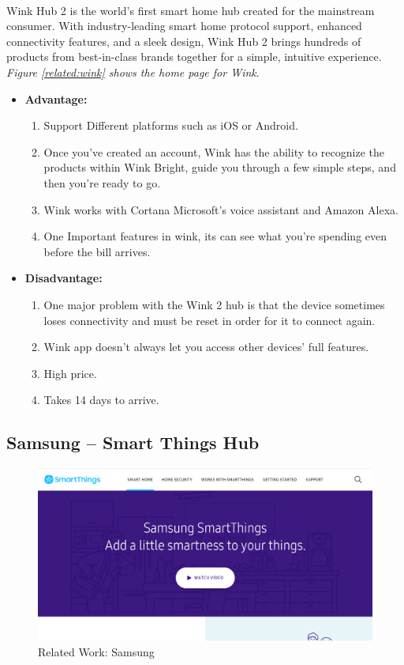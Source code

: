 \documentclass[12pt, oneside, a4paper]{book}
\newcommand\boldcolor[1]{\textcolor{bold}{\textbf{#1}}}
\begin{document}
		\paragraph{}Wink Hub 2 is the world’s first smart home hub created for the mainstream consumer. With industry-leading smart home protocol support, enhanced connectivity features, and a sleek design, Wink Hub 2 brings hundreds of products from best-in-class brands together for a simple, intuitive experience\cite{wink}. \textit{Figure \ref{related:wink} shows the home page for Wink}.
		
		\begin{itemize}
			\item \boldcolor{Advantage:}
			\begin{enumerate}
				\item Support Different platforms such as iOS or Android.
				\item Once you've created an account, Wink has the ability to recognize the products within Wink Bright, guide you through a few simple steps, and then you're ready to go.
				\item Wink works with Cortana Microsoft’s voice assistant and Amazon Alexa.
				\item One Important features in wink, its can see what you’re spending even before the bill arrives.
			\end{enumerate}
			\item \boldcolor{Disadvantage:} 
			\begin{enumerate}
				\item One major problem with the Wink 2 hub is that the device sometimes loses connectivity and must be reset in order for it to connect again.
				\item Wink app doesn't always let you access other devices' full features.
				\item High price.
				\item Takes 14 days to arrive.
			\end{enumerate}
		\end{itemize}
		\newpage
		\subsection{Samsung – Smart Things Hub}
		\begin{figure}[H] 			
			\includegraphics[width=\linewidth]{img/samsung.png}
			\caption{Related Work: Samsung}
			\label{related:samsung}
		\end{figure}
\end{document}
